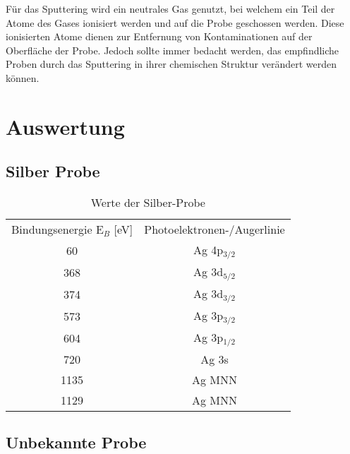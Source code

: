 \documentclass{article}
\begin{document}
Für das Sputtering wird ein neutrales Gas genutzt, bei welchem ein Teil der Atome des Gases ionisiert werden und auf die Probe geschossen werden. Diese ionisierten Atome dienen zur Entfernung von Kontaminationen auf der Oberfläche der Probe. Jedoch sollte immer bedacht werden, das empfindliche Proben durch das Sputtering in ihrer chemischen Struktur verändert werden können. 



\section{Auswertung}

\subsection{Silber Probe}

\begin{table}[htpb]
  \centering
  \caption{Werte der Silber-Probe}
  \label{tab:chsc}
  \begin{tabular}{cc}
   Bindungsenergie E$_B$ [eV] & Photoelektronen-/Augerlinie\\
  60 & Ag 4p$_{3/2}$ \\
 368 & Ag 3d$_{5/2}$ \\
 374 & Ag 3d$_{3/2}$ \\
 573 & Ag 3p$_{3/2}$ \\
 604 & Ag 3p$_{1/2}$ \\
 720 & Ag 3s \\
 1135 & Ag MNN \\
 1129 & Ag MNN \\
  
  \end{tabular}

\end{table}





\subsection{Unbekannte Probe}
\end{document}
